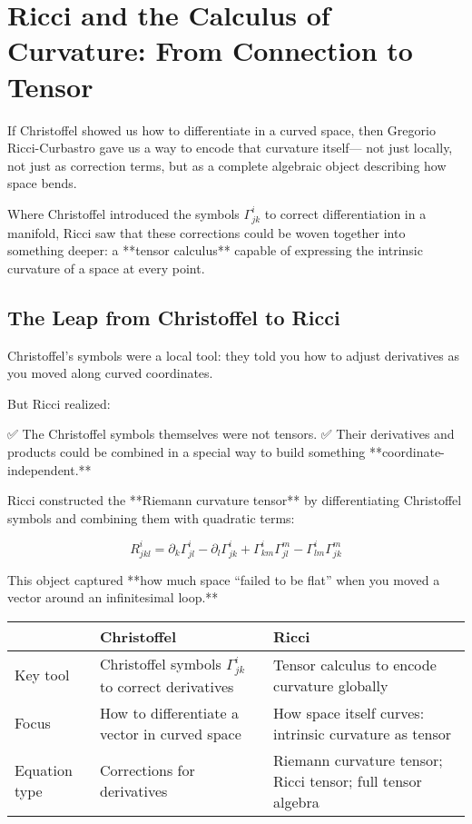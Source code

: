 \section{Ricci and the Calculus of Curvature: From Connection to Tensor}

If Christoffel showed us how to differentiate in a curved space,  
then Gregorio Ricci-Curbastro gave us a way to encode that curvature itself—  
not just locally, not just as correction terms, but as a complete algebraic object describing how space bends.

Where Christoffel introduced the symbols \( \Gamma^i_{jk} \) to correct differentiation in a manifold,  
Ricci saw that these corrections could be woven together into something deeper:  
a **tensor calculus** capable of expressing the intrinsic curvature of a space at every point.

\bigskip

\subsection*{The Leap from Christoffel to Ricci}

Christoffel’s symbols were a local tool:  
they told you how to adjust derivatives as you moved along curved coordinates.

But Ricci realized:

✅ The Christoffel symbols themselves were not tensors.  
✅ Their derivatives and products could be combined in a special way to build something **coordinate-independent.**

Ricci constructed the **Riemann curvature tensor** by differentiating Christoffel symbols and combining them with quadratic terms:

\[
R^i_{jkl} = \partial_k \Gamma^i_{jl} - \partial_l \Gamma^i_{jk} + \Gamma^i_{km} \Gamma^m_{jl} - \Gamma^i_{lm} \Gamma^m_{jk}
\]

This object captured **how much space “failed to be flat” when you moved a vector around an infinitesimal loop.**

\bigskip

\begin{tcolorbox}[colback=gray!5!white, colframe=black, title=\textbf{Sidebar: The Shift from Christoffel to Ricci}, fonttitle=\bfseries, arc=1.5mm, boxrule=0.4pt]

\begin{tabular}{>{\raggedright}p{4cm} >{\raggedright}p{5.5cm} >{\raggedright\arraybackslash}p{5.5cm}}
 & \textbf{Christoffel} & \textbf{Ricci} \\
\midrule
Key tool & Christoffel symbols \( \Gamma^i_{jk} \) to correct derivatives & Tensor calculus to encode curvature globally \\
Focus & How to differentiate a vector in curved space & How space itself curves: intrinsic curvature as tensor \\
Equation type & Corrections for derivatives & Riemann curvature tensor; Ricci tensor; full tensor algebra
\end{tabular}

\end{tcolorbox}


